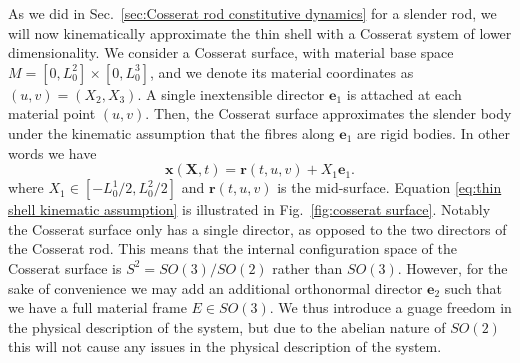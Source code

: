 As we did in Sec.~\ref{sec:Cosserat rod constitutive dynamics} for a slender rod, we will now kinematically approximate the thin shell with a Cosserat system of lower dimensionality. We consider a Cosserat surface, with material base space $M = [0, L_0^2] \times [0, L_0^3]$, and we denote its material coordinates as $(u, v) = (X_2, X_3)$. A single inextensible director $\mathbf{e}_1$ is attached at each material point $(u,v)$. Then, the Cosserat surface approximates the slender body under the kinematic assumption that the fibres along $\mathbf{e}_1$ are rigid bodies. In other words we have
\begin{equation} \label{eq:thin shell kinematic assumption}
\mathbf{x}(\mathbf{X}, t) = \mathbf{r}(t, u, v) + X_1 \mathbf{e}_1.
\end{equation}
where $X_1 \in [-L_0^1/2, L_0^2/2]$ and $\mathbf{r}(t,u,v)$ is the mid-surface. Equation \ref{eq:thin shell kinematic assumption} is illustrated in Fig.~\ref{fig:cosserat surface}. Notably the Cosserat surface only has a single director, as opposed to the two directors of the Cosserat rod. This means that the internal configuration space of the Cosserat surface is $S^2 = SO(3) / SO(2)$ rather than $SO(3)$. However, for the sake of convenience we may add an additional orthonormal director $\mathbf{e}_2$ such that we have a full material frame $E \in SO(3)$. We thus introduce a guage freedom in the physical description of the system, but due to the abelian nature of $SO(2)$ this will not cause any issues in the physical description of the system.

